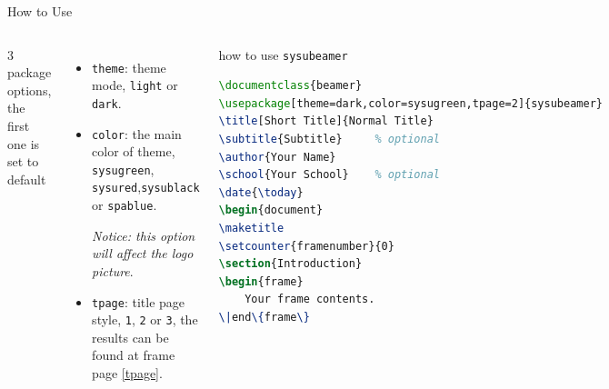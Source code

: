 \documentclass{beamer}
\begin{document}
\begin{frame}[fragile]{How to Use}
\begin{columns}
     3 package options, the first one is set to default
    \begin{itemize}
        \item \texttt{theme}: theme mode, \texttt{light} or \texttt{dark}.
        \item \texttt{color}: the main color of theme, \texttt{sysugreen}, \texttt{sysured},\texttt{sysublack} or \texttt{spablue}.\par
        \textit{Notice: this option will affect the logo picture}.
        \item \texttt{tpage}: title page style, \texttt{1}, \texttt{2} or \texttt{3}, the results can be found at frame page \ref{tpage}.
    \end{itemize}
    \begin{block}{how to use \texttt{sysubeamer}}
\begin{lstlisting}[language=TeX]
\documentclass{beamer}
\usepackage[theme=dark,color=sysugreen,tpage=2]{sysubeamer}
\title[Short Title]{Normal Title}
\subtitle{Subtitle}     % optional
\author{Your Name}
\school{Your School}    % optional
\date{\today}
\begin{document}
\maketitle
\setcounter{framenumber}{0}
\section{Introduction}
\begin{frame}
    Your frame contents.
\|end\{frame\}
\end{lstlisting}
    \end{block}
\end{columns}
\end{frame}
\end{document}
